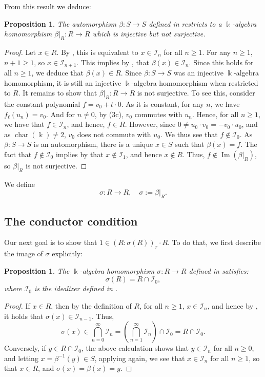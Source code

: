 \documentclass{amsart}
\newtheorem{prop}[equation]{Proposition}
\theoremstyle{definition}
\newcommand{\opn}{\operatorname}
\renewcommand{\k}{\Bbbk}
\numberwithin{equation}{section}
\begin{document}
From this result we deduce:
\begin{prop}\label{prop:injnotsurj}
The automorphism $\beta:S \to S$ defined in  restricts to a $\k$-algebra homomorphism $\beta|_R : R \to R$ which is injective but not surjective.
\end{prop}
\begin{proof}
Let $x \in R$.
By , this is equivalent to $x \in \mathcal{I}_n$ for all $n \ge 1$.
For any $n\ge 1$, $n+1 \ge 1$, so $x \in \mathcal{I}_{n+1}$.
This implies by ,
that $\beta(x) \in \mathcal{I}_n$.
Since this holds for all $n \ge 1$,
we deduce that $\beta(x) \in R$.
Since $\beta:S \to S$ was an injective $\k$-algebra homomorphism,
it is still an injective $\k$-algebra homomorphism when restricted to $R$.
It remains to show that $\beta|_R:R \to R$ is not surjective.
To see this, consider
the constant polynomial $f = v_0 + t\cdot 0$.
As it is constant, for any $n$, we have $f_{\ell}(u_n) = v_0$.
And for $n \ne 0$,
by (3c),
$v_0$ commutes with $u_n$.
Hence, for all $n \ge 1$, 
we have that $f \in \mathcal{I}_n$, and hence, $f \in R$.
However, since $0 \ne u_0\cdot v_0 = -v_0\cdot u_0$, and as $\opn{char}(\k) \ne 2$, $v_0$ does not commute with $u_0$.
We thus see that $f \notin \mathcal{I}_0$.
As $\beta:S \to S$ is an automorphism,
there is a unique $x \in S$ such that $\beta(x) = f$.
The fact that $f \notin \mathcal{I}_0$ implies by 
that $x \notin \mathcal{I}_1$, and hence $x\notin R$.
Thus, $f\notin \opn{Im}(\beta|_R)$,
so $\beta|_R$ is not surjective.
\end{proof}

We define
\begin{equation}\label{eqn:sigma}
\sigma : R \to R, \quad \sigma:=\beta|_R.
\end{equation}

\subsection{The conductor condition}\label{sec:conductor}
Our next goal is to show that $1 \in (R:\sigma(R))_r\cdot R$.
To do that, we first describe the image of $\sigma$ explicitly:
\begin{prop}\label{prop:imsigma}
The $\k$-algebra homomorphism $\sigma:R \to R$ defined in  satisfies:
\[
\sigma(R) = R \cap \mathcal{I}_0,
\]
where $\mathcal{I}_0$ is the idealizer defined in .
\end{prop}
\begin{proof}
If $x \in R$,
then by the definition of $R$, for all $n \ge 1$, $x \in \mathcal{I}_n$,
and hence by , it holds that $\sigma(x) \in \mathcal{I}_{n-1}$.
Thus, 
\[
\sigma(x) \in \bigcap_{n=0}^{\infty} \mathcal{I}_n = \left(\bigcap_{n=1}^{\infty} \mathcal{I}_n\right) \cap \mathcal{I}_0 = R\cap \mathcal{I}_0.
\]
Conversely, if $y \in R\cap \mathcal{I}_0$,
the above calculation shows that $y \in \mathcal{I}_n$ for all $n \ge 0$,
and letting $x = \beta^{-1}(y) \in S$,
applying  again, 
we see that $x \in \mathcal{I}_n$ for all $n \ge 1$,
so that $x \in R$, and $\sigma(x) = \beta(x) = y$.
\end{proof}
\end{document}
